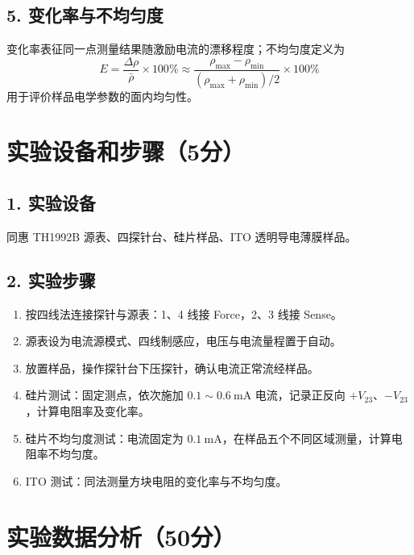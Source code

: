 \documentclass[12pt,a4paper]{ctexart}
\begin{document}
\subsection*{5. 变化率与不均匀度}
变化率表征同一点测量结果随激励电流的漂移程度；不均匀度定义为
\begin{equation}
E=\frac{\Delta \rho}{\bar{\rho}}\times 100\%\approx
\frac{\rho_{\max}-\rho_{\min}}{(\rho_{\max}+\rho_{\min})/2}\times 100\%
\end{equation}
用于评价样品电学参数的面内均匀性。

\section*{实验设备和步骤（5分）}

\subsection*{1. 实验设备}
同惠 TH1992B 源表、四探针台、硅片样品、ITO 透明导电薄膜样品。

\subsection*{2. 实验步骤}
\begin{enumerate}
    \item 按四线法连接探针与源表：1、4 线接 Force，2、3 线接 Sense。
    \item 源表设为电流源模式、四线制感应，电压与电流量程置于自动。
    \item 放置样品，操作探针台下压探针，确认电流正常流经样品。
    \item 硅片测试：固定测点，依次施加 $0.1\sim0.6\ \mathrm{mA}$ 电流，记录正反向 $+V_{23}$、$-V_{23}$，计算电阻率及变化率。
    \item 硅片不均匀度测试：电流固定为 $0.1\ \mathrm{mA}$，在样品五个不同区域测量，计算电阻率不均匀度。
    \item ITO 测试：同法测量方块电阻的变化率与不均匀度。
\end{enumerate}

\section*{实验数据分析（50分）}
\end{document}
